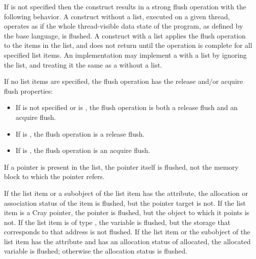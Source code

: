 \descr
If  is not specified then the  construct
results in a strong flush operation with the following behavior. A 
construct without a list, executed on a given thread, operates as if the whole
thread-visible data state of the program, as defined by the base language, is
flushed. A  construct with a list applies the flush operation to
the items in the list, and does not return until the operation is complete for
all specified list items. An implementation may implement a  with
a list by ignoring the list, and treating it the same as a 
without a list.

If no list items are specified, the flush operation has the release and/or
acquire flush properties:

\begin{itemize}
\item If  is not specified or is , the flush operation
is both a release flush and an acquire flush.

\item If  is , the flush operation is a release flush.

\item If  is , the flush operation is an acquire flush.
\end{itemize}

\begin{ccppspecific}
If a pointer is present in the list, the pointer itself is flushed, not the memory block to
which the pointer refers.
\end{ccppspecific}

\begin{fortranspecific}
If the list item or a subobject of the list item has the  attribute, the allocation
or association status of the  item is flushed, but the pointer target is not. If the
list item is a Cray pointer, the pointer is flushed, but the object to which it points is not.
If the list item is of type , the variable is flushed, but the storage that corresponds
to that address is not flushed. If the list item or the subobject of the list item has the
 attribute and has an allocation status of allocated, the
allocated variable is flushed; otherwise the allocation status is flushed.
\end{fortranspecific}

